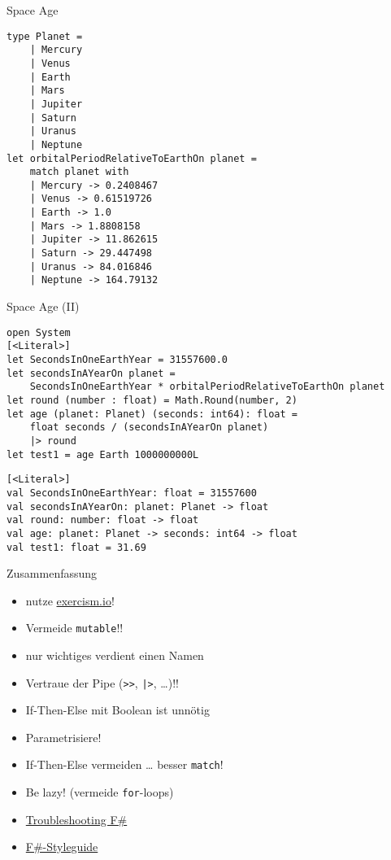 \documentclass[t]{beamer}
\begin{document}
\begin{frame}[label={sec:orgcad67cb},fragile]{Space Age}
 \begin{verbatim}
type Planet = 
    | Mercury
    | Venus
    | Earth
    | Mars
    | Jupiter
    | Saturn
    | Uranus
    | Neptune
let orbitalPeriodRelativeToEarthOn planet = 
    match planet with
    | Mercury -> 0.2408467
    | Venus -> 0.61519726
    | Earth -> 1.0
    | Mars -> 1.8808158
    | Jupiter -> 11.862615
    | Saturn -> 29.447498
    | Uranus -> 84.016846
    | Neptune -> 164.79132
\end{verbatim}
\end{frame}


\begin{frame}[label={sec:org6b66d58},fragile]{Space Age (II)}
 \begin{verbatim}
open System
[<Literal>]
let SecondsInOneEarthYear = 31557600.0
let secondsInAYearOn planet =
    SecondsInOneEarthYear * orbitalPeriodRelativeToEarthOn planet
let round (number : float) = Math.Round(number, 2)
let age (planet: Planet) (seconds: int64): float =
    float seconds / (secondsInAYearOn planet)
    |> round
let test1 = age Earth 1000000000L
\end{verbatim}

\begin{verbatim}
[<Literal>]
val SecondsInOneEarthYear: float = 31557600
val secondsInAYearOn: planet: Planet -> float
val round: number: float -> float
val age: planet: Planet -> seconds: int64 -> float
val test1: float = 31.69
\end{verbatim}
\end{frame}

\begin{frame}[label={sec:org486e818},fragile]{Zusammenfassung}
 \begin{itemize}
\item nutze \href{https://exercism.io}{exercism.io}!
\item Vermeide \texttt{mutable}!!
\item nur wichtiges verdient einen Namen
\item Vertraue der \alert{Pipe} (\texttt{>{}>{}}, \texttt{|>}, \ldots{})!!
\item If-Then-Else mit Boolean ist unnötig
\item Parametrisiere!
\item If-Then-Else vermeiden \ldots{} besser \texttt{match}!
\item Be lazy! (vermeide \texttt{for}-loops)
\item \href{https://fsharpforfunandprofit.com/troubleshooting-fsharp/}{Troubleshooting F\#}
\item \href{https://docs.microsoft.com/de-de/dotnet/fsharp/style-guide/}{F\#-Styleguide}
\end{itemize}
\end{frame}
\end{document}

